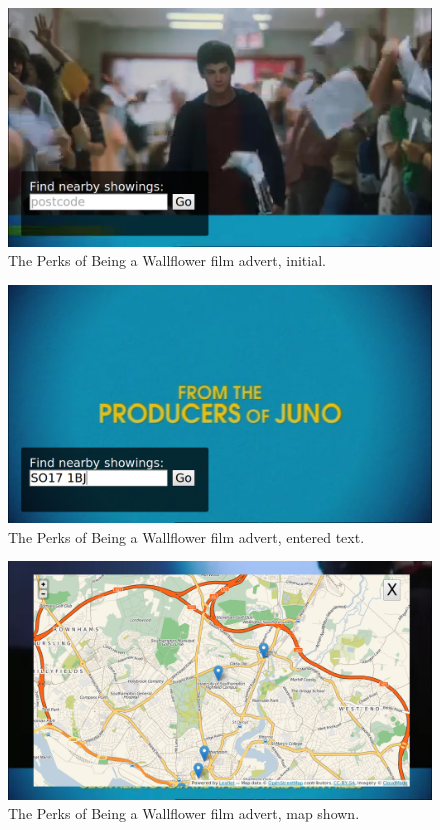 	\begin{figure}[th]
		\centering
		\includegraphics[width=\textwidth,height=0.5\textheight,keepaspectratio]{images/adverts/wallflower-1.png}
		\caption{The Perks of Being a Wallflower film advert, initial.}
		\label{fig:wallflower1}
	\end{figure}
	
	\begin{figure}[th]
		\centering
		\includegraphics[width=\textwidth,height=0.5\textheight,keepaspectratio]{images/adverts/wallflower-2.png}
		\caption{The Perks of Being a Wallflower film advert, entered text.}
		\label{fig:wallflower2}
	\end{figure}
	
	\begin{figure}[th]
		\centering
		\includegraphics[width=\textwidth,height=0.5\textheight,keepaspectratio]{images/adverts/wallflower-3.png}
		\caption{The Perks of Being a Wallflower film advert, map shown.}
		\label{fig:wallflower3}
	\end{figure}
	
